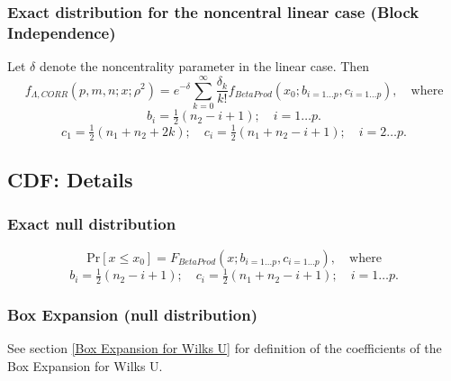 \subsubsection{Exact distribution for the noncentral linear case (Block Independence)}
Let $\delta$ denote the noncentrality parameter in the linear case. Then
\begin{equation}
	f_{\Lambda,CORR}(p,m,n;x;\rho^2) = e^{-\delta} \sum_{k=0}^{\infty} \frac{\delta_k}{k!} f_{BetaProd}(x_0; b_{i=1\ldots p},c_{i=1\ldots p}), \quad \text{where}
\end{equation}
\begin{equation}
	b_i = \tfrac{1}{2} (n_2 -i+1); \quad i=1 \ldots p.
\end{equation}
\begin{equation}
	c_1 = \tfrac{1}{2} (n_1 + n_2 +2k); \quad c_i = \tfrac{1}{2} (n_1 + n_2 -i+1); \quad i=2 \ldots p.
\end{equation}




\subsection{CDF: Details}

\subsubsection{Exact null distribution}
\label{WilksLambdaDistributionDistributionCDF}

\begin{equation}
	\text{Pr}[x \leq x_0] = F_{BetaProd}(x; b_{i=1\ldots p},c_{i=1\ldots p}), \quad \text{where}
\end{equation}
\begin{equation}
	b_i = \tfrac{1}{2} (n_2 -i+1); \quad c_i = \tfrac{1}{2} (n_1 + n_2 -i+1); \quad i=1 \ldots p.
\end{equation}


\subsubsection{Box Expansion (null distribution)}
See section \ref{Box Expansion for Wilks U} for definition of the coefficients of the Box Expansion for Wilks U.





